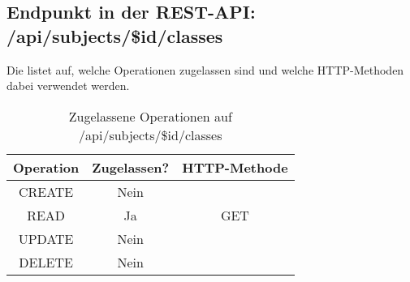 \subsection{Endpunkt in der REST-API: /api/subjects/\$id/classes}
Die  listet auf, welche Operationen zugelassen sind und welche HTTP-Methoden dabei verwendet werden. 

\begin{table}[!htbp]
	\begin{tabular}{|c|c|c|}
		\hline
			\textbf{Operation} & \textbf{Zugelassen?} & \textbf{HTTP-Methode} \\ \hline
			CREATE & Nein & \\ \hline 
			READ & Ja & GET \\ \hline
			UPDATE & Nein & \\ \hline 
			DELETE & Nein & \\ \hline
	\end{tabular}

		\caption{Zugelassene Operationen auf /api/subjects/\$id/classes}
		\label{tab:rest:api:subjects:id:classes:meth}
\end{table}

